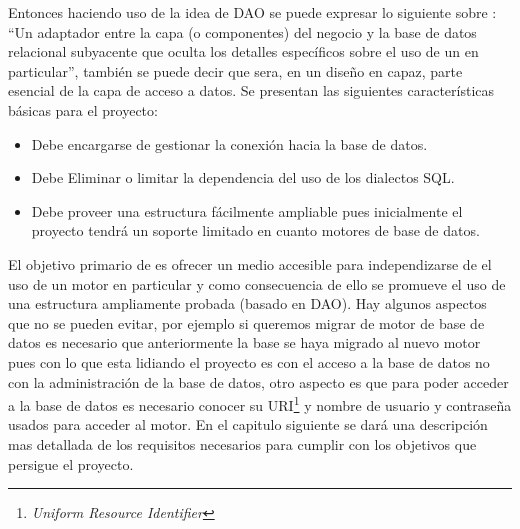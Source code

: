 Entonces haciendo uso de la idea de DAO se puede expresar lo siguiente sobre \jj: ``Un adaptador entre la capa (o componentes) del negocio y la base de datos relacional subyacente que oculta los detalles específicos sobre el uso de un \dd en particular'', también se puede decir que \jj sera, en un diseño en capaz, parte esencial de la capa de acceso a datos. Se presentan las siguientes características básicas para el proyecto:
%
\begin{itemize}
\item Debe encargarse de gestionar la conexión hacia la base de datos.
\item Debe Eliminar o limitar la dependencia del uso de los dialectos SQL.
\item Debe proveer una estructura fácilmente ampliable pues inicialmente el proyecto tendrá un soporte limitado en cuanto motores de base de datos.
\end{itemize}
%
El objetivo primario de \jj es ofrecer un medio accesible para independizarse de el uso de un motor en particular y como consecuencia de ello se promueve el uso de una estructura ampliamente probada (basado en DAO). Hay algunos aspectos que no se pueden evitar, por ejemplo si queremos migrar de motor de base de datos es necesario que anteriormente la base se haya migrado al nuevo motor pues con lo que esta lidiando el proyecto es con el acceso a la base de datos no con la administración de la base de datos, otro aspecto es que para poder acceder a la base de datos es necesario conocer su URI\footnote{\textit{Uniform Resource Identifier}} y nombre de usuario y contraseña usados para acceder al motor. En el capitulo siguiente se dará una descripción mas detallada de los requisitos necesarios para cumplir con los objetivos que persigue el proyecto. 